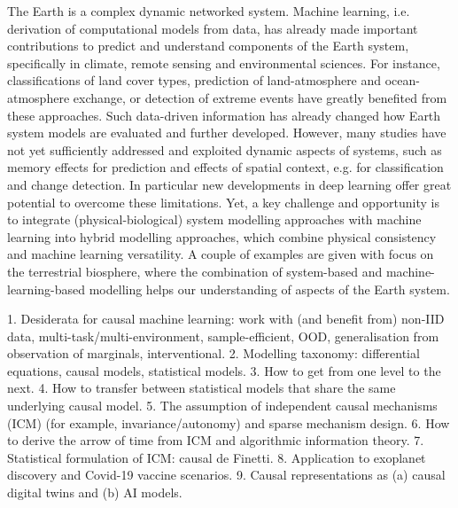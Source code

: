 \license

The Earth is a complex dynamic networked system. Machine learning, i.e. derivation of computational models from data, has already made important contributions to predict and understand components of the Earth system, specifically in climate, remote sensing and environmental sciences. For instance, classifications of land cover types, prediction of land-atmosphere and ocean-atmosphere exchange, or detection of extreme events have greatly benefited from these approaches. Such data-driven information has already changed how Earth system models are evaluated and further developed. However, many studies have not yet sufficiently addressed and exploited dynamic aspects of systems, such as memory effects for prediction and effects of spatial context, e.g. for classification and change detection. In particular new developments in deep learning offer great potential to overcome these limitations. Yet, a key challenge and opportunity is to integrate (physical-biological) system modelling approaches with machine learning into hybrid modelling approaches, which combine physical consistency and machine learning versatility. A couple of examples are given with focus on the terrestrial biosphere, where the combination of system-based and machine-learning-based modelling helps our understanding of aspects of the Earth system.

\license

1.	Desiderata for causal machine learning: work with (and benefit from) non-IID data, multi-task/multi-environment, sample-efficient, OOD, generalisation from observation of marginals, interventional.
2.	Modelling taxonomy: differential equations, causal models, statistical models.
3.	How to get from one level to the next.
4.	How to transfer between statistical models that share the same underlying causal model. 
5.	The assumption of independent causal mechanisms (ICM) (for example, invariance/autonomy) and sparse mechanism design. 
6.	How to derive the arrow of time from ICM and algorithmic information theory.
7.	Statistical formulation of ICM: causal de Finetti.
8.	Application to exoplanet discovery and Covid-19 vaccine scenarios.
9.	Causal representations as (a) causal digital twins and (b) AI models.


